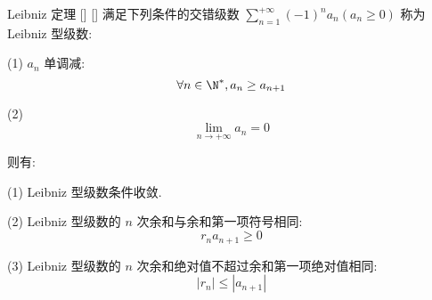 \documentclass[UTF8]{ctexart}
\begin{document}
			\begin{thm}
			    []
			    {Leibniz 定理}
			    []
			    []
				满足下列条件的交错级数 \(\sum\limits_{n=1}^{+\infty}{(-1)}^n a_n(a_n\geq 0)\) 称为 Leibniz 型级数: 
				
				(1) \(a_n\) 单调减: 
				\[\forall n\in\N^*, a_n\geq a_{n+1}\]
				
				(2) \[\lim_{n\to+\infty}a_n=0\]

				则有: 
				
				(1) Leibniz 型级数条件收敛. 

				(2) Leibniz 型级数的 \(n\) 次余和与余和第一项符号相同: 
				\[r_n a_{n+1}\geq 0\]

				(3) Leibniz 型级数的 \(n\) 次余和绝对值不超过余和第一项绝对值相同: 
				\[|r_n|\leq|a_{n+1}|\]
			\end{thm}
\end{document}
